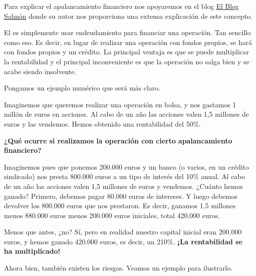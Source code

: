 \documentclass[nochap,palatino,shortheader]{apuntes}
\newcommand{\study}[1]{#1} \newcommand{\substudy}[1]{#1}
\begin{document}
Para explicar el apalancamiento financiero nos apoyaremos en el blog \href{http://www.elblogsalmon.com/conceptos-de-economia/que-es-el-apalancamiento-financiero}{El Blog Salmón} donde su autor nos proporciona una extensa explicación de este concepto.

El  es simplemente \study{usar endeudamiento para financiar una operación}. Tan sencillo como eso. Es decir, en lugar de realizar una operación con fondos propios, se hará con fondos propios y un crédito. La principal \substudy{ventaja} es que se puede \substudy{multiplicar} la \substudy{rentabilidad} y el principal \substudy{inconveniente} es que la operación no salga bien y se \substudy{acabe siendo insolvente}.

\study{Pongamos un ejemplo numérico que será más claro.}

\begin{example}
Imaginemos que queremos realizar una operación en bolsa, y nos gastamos 1 millón de euros en acciones. Al cabo de un año las acciones valen 1,5 millones de euros y las vendemos. Hemos obtenido una rentabilidad del 50\%.

\textbf{¿Qué ocurre si realizamos la operación con cierto apalancamiento financiero?}

Imaginemos pues que ponemos 200.000 euros y un banco (o varios, en un crédito sindicado) nos presta 800.000 euros a un tipo de interés del 10\% anual. Al cabo de un año las acciones valen 1,5 millones de euros y vendemos. ¿Cuánto hemos ganado? Primero, debemos pagar 80.000 euros de intereses. Y luego debemos devolver los 800.000 euros que nos prestaron. Es decir, ganamos 1,5 millones menos 880.000 euros menos 200.000 euros iniciales, total 420.000 euros.

Menos que antes, ¿no? Sí, pero en realidad nuestro capital inicial eran 200.000 euros, y hemos ganado 420.000 euros, es decir, un 210\%. \textbf{¡La rentabilidad se ha multiplicado!}
\end{example}

Ahora bien, también existen los riesgos. Veamos un ejemplo para ilustrarlo.
\end{document}

